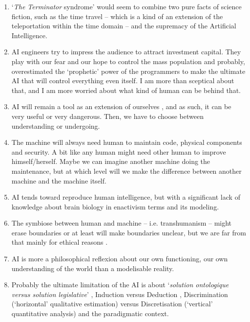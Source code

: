 \documentclass{article}
\begin{document}
\begin{enumerate}[leftmargin=*,label=\underline{\textit{Statement} \arabic*} :]
\item `\textit{The Terminator} syndrome' would seem to combine two pure facts of science fiction, such as the time travel -- which is a kind of an extension of the teleportation within the time domain -- and the supremacy of the Artificial Intelligence.
\item AI engineers try to impress the audience to attract investment capital. They play with our fear and our hope to control the mass population and probably, overestimated the `prophetic' power of the programmers to make the ultimate AI that will control everything even itself. I am more than sceptical about that, and I am more worried about what kind of human can be behind that. 
\item AI will remain a tool  as an extension of ourselves \citep{mm}, and as such, it can be very useful or very dangerous. Then, we have to choose between understanding or undergoing.
\item The machine will always need human to maintain code, physical components and security. A bit like any human might need other human to improve himself/herself. Maybe we can imagine another machine doing the maintenance, but at which level will we make the difference between another machine and the machine itself.
\item AI tends toward reproduce human intelligence, but with a significant lack of knowledge about brain biology in enactivism terms and its modeling.
\item The symbiose between human and machine -- i.e. transhumanism --  might erase boundaries or at least will make boundaries unclear, but we are far from that mainly for ethical reasons \citep{hgw}.  
\item AI is more a philosophical reflexion about our own functioning, our own understanding of the world than a modelisable reality.
\item Probably the ultimate limitation of the AI is about `\textit{solution ontologique versus solution legislative}' \citep{cse}, Induction versus Deduction \citep{fxd}, Discrimination (`horizontal' qualitative estimation) versus  Discretisation (`vertical' quantitative analysis) and the paradigmatic context.
\end{enumerate}



\begin{spacing}{0.1}
\renewcommand*\contentsname{Contents}
\tableofcontents
\end{spacing}
\end{document}
